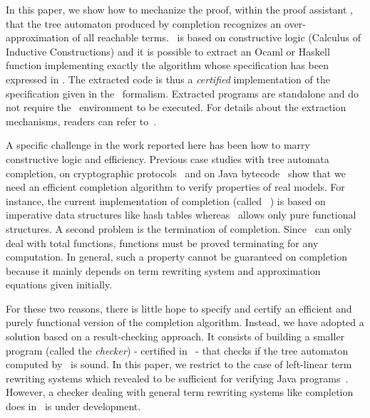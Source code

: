 In this paper, we show how to mechanize the proof, within the proof
assistant \coq, that the tree automaton produced by completion
recognizes an over-approximation of all reachable terms. 
 \coq\ is based on constructive logic (Calculus of
Inductive Constructions) and it is possible to 
extract an Ocaml or Haskell
function implementing exactly the algorithm whose specification has
been 
expressed in \coq. The extracted code is thus a {\em certified}
implementation of the specification given in the \coq\ formalism.  Extracted
programs are standalone and do not require the \coq\ environment to be
executed. For details about the extraction 
mechanisms, readers can refer to~\cite{coqart}.

A specific challenge in the work reported here has been how to marry
constructive logic and efficiency. Previous case studies with tree
automata completion, on cryptographic
protocols~\cite{GenetTTVTT-wits03} and on Java
bytecode~\cite{BoichutGJL-RTA07} show that we need an efficient
completion algorithm to verify properties of real models. 
For instance, the current implementation of completion (called
\timbuk~\cite{timbuk-site}) is based on imperative data structures like hash
tables whereas \coq\ allows only pure functional structures.  A second problem
is the termination of completion. Since \coq\ can only deal with total
functions, functions must be proved terminating for any
computation. In general, such a property cannot be guaranteed on completion
because it mainly depends on term rewriting system and approximation equations
given initially.

For these two reasons, there is little hope to specify and certify an
efficient and purely functional version of the completion
algorithm. Instead, we
have adopted a solution based on a result-checking approach.  
It consists of building a smaller program (called the
\emph{checker}) - certified in \coq\ -  that checks if the tree automaton computed by \timbuk\ is
sound. In this paper, we restrict to the case of left-linear term rewriting
systems which revealed to be sufficient for verifying Java
programs~\cite{BoichutGJL-RTA07}. However, a checker dealing with general term
rewriting systems like completion does in~\cite{FeuilladeGVTT-JAR04} is under
development.

